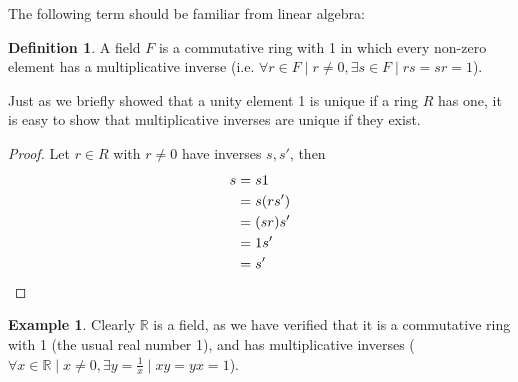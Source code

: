 \documentclass[12pt,letterpaper,DIV=11,final]{scrartcl}
\theoremstyle{plain}
\theoremstyle{definition}
\newtheorem{definition}{Definition}[section]
\newtheorem{example}{Example}[section]
\theoremstyle{remark}
\begin{document}
The following term should be familiar from linear algebra:

\begin{definition}
  A field $F$ is a commutative ring with 1 in which every non-zero element has a multiplicative inverse (i.e. $\forall r \in F \mid r \neq 0, \exists s \in F \mid rs = sr = 1$).
\end{definition}

Just as we briefly showed that a unity element 1 is unique if a ring $R$ has one,
it is easy to show that multiplicative inverses are unique if they exist.
\begin{proof}
  Let $r \in R$ with $r \neq 0$ have inverses $s, s'$, then
  \begin{align*}
    s &= s1 \\
      &= s (r s') \\
      &= (sr) s' \\
      &= 1 s' \\
      &= s' \qedhere
  \end{align*}
\end{proof}

\begin{example}
  Clearly $\mathbb{R}$ is a field, as we have verified that it is a commutative ring with 1 (the usual real number 1), and has multiplicative inverses ($\forall x \in \mathbb{R} \mid x \neq 0, \exists y = \frac{1}{x} \mid xy = yx = 1$).
\end{example}
\end{document}
